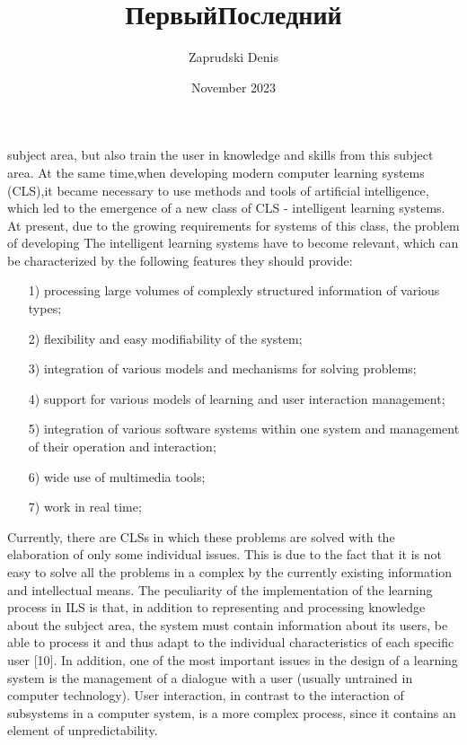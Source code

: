 \documentclass[a4paper, 10pt,twocolumn]{article}
\title{ПервыйПоследний}
\author{Zaprudski Denis }
\date{November 2023}
\begin{document}
\twocolumn
\setcounter{page}{258}
subject area, but also train the user in knowledge and skills  from this subject area. At the same time,when developing modern computer learning systems (CLS),it became necessary to use methods and tools of artificial intelligence, which led to the emergence of a new class of CLS - intelligent learning systems. At present, due to the growing requirements for systems of this class, the problem of developing The intelligent learning systems have to become relevant, which can be characterized by the following features they should provide:
\begin{enumerate}
    \item[1)] processing large volumes of complexly structured information of various types;
    \item[2)] flexibility and easy modifiability of the system;
    \item[3)] integration of various models and mechanisms for solving problems;
    \item[4)] support for various models of learning and user interaction management;
    \item[5)] integration of various software systems within one system and management of their operation and interaction;
    \item[6)] wide use of multimedia tools;
    \item[7)] work in real time;
\end{enumerate}

Currently, there are CLSs in which these problems
are solved with the elaboration of only some individual
issues. This is due to the fact that it is not easy to solve
all the problems in a complex by the currently existing
information and intellectual means. The peculiarity of the
implementation of the learning process in ILS is that, in
addition to representing and processing knowledge about
the subject area, the system must contain information
about its users, be able to process it and thus adapt to
the individual characteristics of each specific user [10]. In
addition, one of the most important issues in the design of
a learning system is the management of a dialogue with
a user (usually untrained in computer technology). User
interaction, in contrast to the interaction of subsystems
in a computer system, is a more complex process, since
it contains an element of unpredictability.
\end{document}
